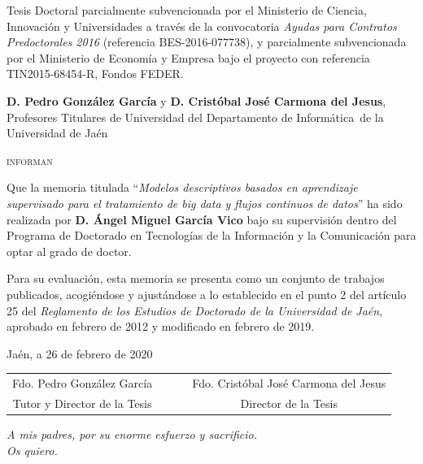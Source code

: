 \documentclass[c5paper,10pt,twoside]{book}	   	%
\def\autor{Ángel Miguel García Vico}
\def\titulo{Modelos descriptivos basados en aprendizaje supervisado para el tratamiento de big data y flujos continuos de datos}
\def\universidad{Universidad de Jaén}
\def\tutorUno{Pedro González García}
\def\dptoUno{Departamento de Informática}
\def\tutorDos{Cristóbal José Carmona del Jesus}
\begin{document}
Tesis Doctoral parcialmente subvencionada por el Ministerio de Ciencia, Innovación y Universidades a través de la convocatoria \textit{Ayudas para Contratos Predoctorales 2016} (referencia BES-2016-077738), y parcialmente subvencionada por el Ministerio de Economía y Empresa bajo el proyecto con referencia  TIN2015-68454-R, Fondos FEDER.


\cleardoublepage




\textbf{D. \tutorUno} y \textbf{D. \tutorDos}, Profesores Titulares de Universidad del \dptoUno~de la \universidad

\bigskip
\bigskip

\textsc{informan}

\bigskip
\bigskip

Que la memoria titulada ``\textit{\titulo}'' ha sido realizada por \textbf{D. \autor} bajo su supervisión dentro del Programa de Doctorado en Tecnologías de la Información y la Comunicación para optar al grado de doctor. 

\bigskip
Para su evaluación, esta memoria se presenta como un conjunto de trabajos publicados, acogiéndose y ajustándose a lo establecido en el punto 2 del artículo 25 del \textit{Reglamento de los Estudios de Doctorado de la \universidad}, aprobado en febrero de 2012 y modificado en febrero de 2019.


\vspace{5mm}

\begin{flushright}
	Jaén, a 26 de febrero de 2020
\end{flushright}

\vspace{\fill}

\begin{center}
	\begin{tabular}{cc}
		Fdo. \tutorUno & ~~~~~Fdo. \tutorDos \\
		Tutor y Director de la Tesis & ~~~~~Director de la Tesis
	\end{tabular}
\end{center}


\cleardoublepage
\begin{flushright}
	\textit{A mis padres, por su enorme esfuerzo y sacrificio.\\Os quiero.}
	\par {}
\end{flushright}
%
\clearpage{} \cleardoublepage
\end{document}

